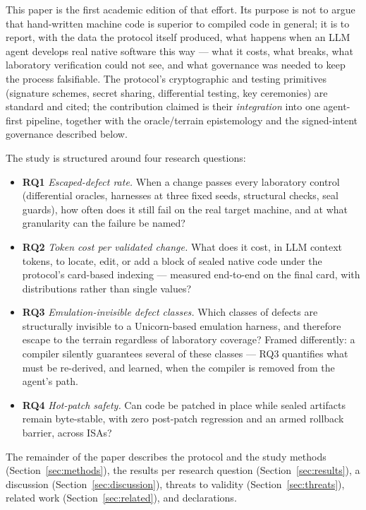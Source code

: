 \documentclass[11pt,a4paper]{article}
\newcommand{\RQ}[1]{\textbf{RQ#1}}
\begin{document}
This paper is the first academic edition of that effort. Its purpose is
not to argue that hand-written machine code is superior to compiled code
in general; it is to report, with the data the protocol itself produced,
what happens when an LLM agent develops real native software this way ---
what it costs, what breaks, what laboratory verification could not see,
and what governance was needed to keep the process falsifiable. The
protocol's cryptographic and testing primitives (signature schemes,
secret sharing, differential testing, key ceremonies) are standard and
cited; the contribution claimed is their \emph{integration} into one
agent-first pipeline, together with the oracle/terrain epistemology and
the signed-intent governance described below.

The study is structured around four research questions:

\begin{itemize}
\item \RQ{1} \emph{Escaped-defect rate.} When a change passes every
laboratory control (differential oracles, harnesses at three fixed seeds,
structural checks, seal guards), how often does it still fail on the real
target machine, and at what granularity can the failure be named?
\item \RQ{2} \emph{Token cost per validated change.} What does it cost,
in LLM context tokens, to locate, edit, or add a block of sealed native
code under the protocol's card-based indexing --- measured end-to-end
on the final card, with distributions rather than single values?
\item \RQ{3} \emph{Emulation-invisible defect classes.} Which classes of
defects are structurally invisible to a Unicorn-based emulation harness,
and therefore escape to the terrain regardless of laboratory coverage?
Framed differently: a compiler silently guarantees several of these
classes --- RQ3 quantifies what must be re-derived, and learned, when the
compiler is removed from the agent's path.
\item \RQ{4} \emph{Hot-patch safety.} Can code be patched in place while
sealed artifacts remain byte-stable, with zero post-patch regression and
an armed rollback barrier, across ISAs?
\end{itemize}

The remainder of the paper describes the protocol and the study methods
(Section~\ref{sec:methods}), the results per research question
(Section~\ref{sec:results}), a discussion (Section~\ref{sec:discussion}),
threats to validity (Section~\ref{sec:threats}), related work
(Section~\ref{sec:related}), and declarations.
\end{document}
